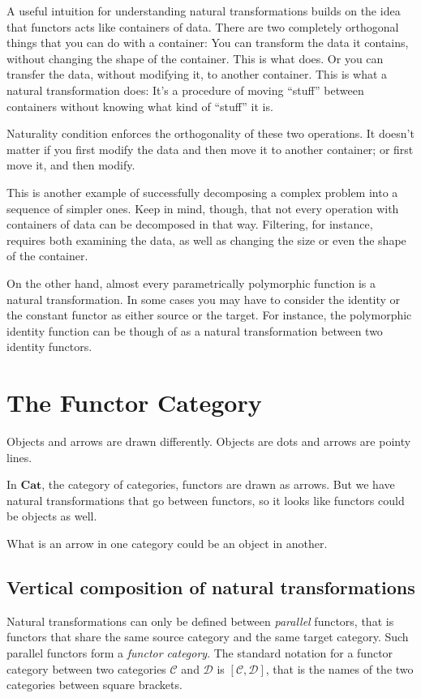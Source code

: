 \documentclass[DaoFP]{subfiles}
\begin{document}
A useful intuition for understanding natural transformations builds on the idea that functors acts like containers of data. There are two completely orthogonal things that you can do with a container: You can transform the data it contains, without changing the shape of the container. This is what  does. Or you can transfer the data, without modifying it, to another container. This is what a natural transformation does: It's a procedure of moving ``stuff'' between containers without knowing what kind of ``stuff'' it is. 

Naturality condition enforces the orthogonality of these two operations. It doesn't matter if you first modify the data and then move it to another container; or first move it, and then modify. 

This is another example of successfully decomposing a complex problem into a sequence of simpler ones. Keep in mind, though, that not every operation with containers of data can be decomposed in that way. Filtering, for instance, requires both examining the data, as well as changing the size or even the shape of the container. 

On the other hand, almost every parametrically polymorphic function is a natural transformation. In some cases you may have to consider the identity or the constant functor as either source or the target. For instance, the polymorphic identity function can be though of as a natural transformation between two identity functors.

\section{The Functor Category}

Objects and arrows are drawn differently. Objects are dots and arrows are pointy lines.

In $\mathbf{Cat}$, the category of categories, functors are drawn as arrows. But we have natural transformations that go between functors, so it looks like functors could be objects as well. 

What is an arrow in one category could be an object in another.

\subsection{Vertical composition of natural transformations}

Natural transformations can only be defined between \emph{parallel} functors, that is functors that share the same source category and the same target category. Such parallel functors form a \emph{functor category}. The standard notation for a functor category between two categories $\mathcal{C}$ and $\mathcal{D}$ is $[\mathcal{C}, \mathcal{D}]$, that is the names of the two categories between square brackets.
\end{document}
